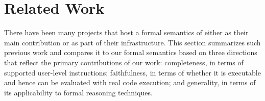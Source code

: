 \section{Related Work}\label{sec:RW}

% 
% 


There have been many projects that host a formal semantics of \ISA either as
their main contribution or as part of their infrastructure.
This section summarizes such previous work and compares it to our formal semantics based on three directions that reflect the primary contributions of our work: completeness, in terms of supported user-level instructions; faithfulness, in
terms of whether it is executable and hence can be evaluated with real code
execution; and generality, in terms of its applicability to
formal reasoning techniques.

